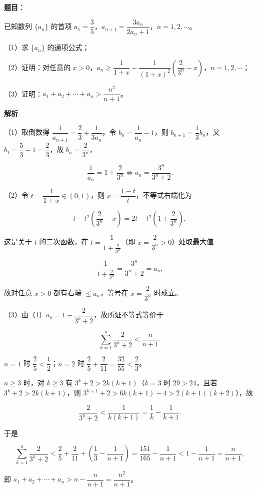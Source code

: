 \begin{answer}

\textbf{题目}：

已知数列 $\{a_n\}$ 的首项 $a_1=\dfrac35$，$a_{n+1}=\dfrac{3a_n}{2a_n+1}$，$n=1,2,\cdots$。

（1）求 $\{a_n\}$ 的通项公式；

（2）证明：对任意的 $x>0$，$a_n\geqslant\dfrac1{1+x}-\dfrac1{(1+x)^2}\left(\dfrac2{3^n}-x\right)$，$n=1,2,\cdots$；

（3）证明：$a_1+a_2+\cdots+a_n>\dfrac{n^2}{n+1}$。

\textbf{解析}

（1）取倒数得 $\dfrac1{a_{n+1}}=\dfrac23+\dfrac1{3a_n}$。令 $b_n=\dfrac1{a_n}-1$，则 $b_{n+1}=\dfrac13b_n$，又 $b_1=\dfrac53-1=\dfrac23$，故 $b_n=\dfrac2{3^n}$，

\nopagebreak[4]
\[\frac1{a_n}=1+\frac2{3^n}\iff a_n=\frac{3^n}{3^n+2}.\]

（2）令 $t=\dfrac1{1+x}\in(0,1)$，则 $x=\dfrac{1-t}t$，不等式右端化为

\nopagebreak[4]
\[t-t^2\left(\frac2{3^n}-x\right)=2t-t^2\left(1+\frac2{3^n}\right),\]

这是关于 $t$ 的二次函数，在 $t=\dfrac1{1+\frac2{3^n}}$（即 $x=\dfrac2{3^n}>0$）处取最大值

\nopagebreak[4]
\[\frac1{1+\frac2{3^n}}=\frac{3^n}{3^n+2}=a_n,\]

故对任意 $x>0$ 都有右端 $\leqslant a_n$，等号在 $x=\dfrac2{3^n}$ 时成立。

（3）由（1）$a_k=1-\dfrac2{3^k+2}$，故所证不等式等价于

\nopagebreak[4]
\[\sum_{k=1}^n\frac2{3^k+2}<\frac n{n+1}.\]

$n=1$ 时 $\dfrac25<\dfrac12$；$n=2$ 时 $\dfrac25+\dfrac2{11}=\dfrac{32}{55}<\dfrac23$。

$n\geqslant3$ 时，对 $k\geqslant3$ 有 $3^k+2>2k(k+1)$（$k=3$ 时 $29>24$，且若 $3^k+2>2k(k+1)$，则 $3^{k+1}+2>6k(k+1)-4>2(k+1)(k+2)$），故

\nopagebreak[4]
\[\frac2{3^k+2}<\frac1{k(k+1)}=\frac1k-\frac1{k+1}.\]

于是

\nopagebreak[4]
\[\sum_{k=1}^n\frac2{3^k+2}<\frac25+\frac2{11}+\left(\frac13-\frac1{n+1}\right)=\frac{151}{165}-\frac1{n+1}<1-\frac1{n+1}=\frac n{n+1},\]

即 $a_1+a_2+\cdots+a_n>n-\dfrac n{n+1}=\dfrac{n^2}{n+1}$。


\end{answer}